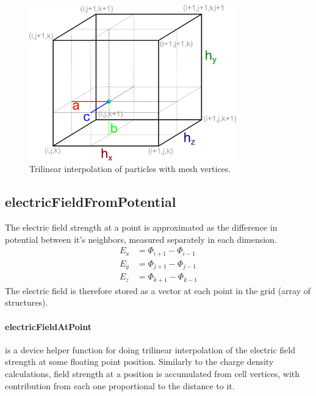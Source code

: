 \begin{figure}
	\centering
	\includegraphics[width=0.8\textwidth]{figure/trilinear}
	\caption{Trilinear interpolation of particles with mesh vertices.}
	\label{fig:trilinear}
\end{figure}

\subsection{electricFieldFromPotential}
The electric field strength at a point is approximated as the difference in potential between it's neighbors, measured
separately in each dimension.
\begin{align*}
	E_x &= \Phi_{i+1} - \Phi_{i-1}\\
	E_y &= \Phi_{j+1} - \Phi_{j-1}\\
	E_z &= \Phi_{k+1} - \Phi_{k-1}
\end{align*}
The electric field is therefore stored as a vector at each point in the grid (array of structures).

\paragraph{electricFieldAtPoint} is a device helper function for doing trilinear interpolation of the electric field strength at some floating point
position. Similarly to the charge density calculations, field strength at a position is accumulated from cell vertices,
with contribution from each one proportional to the distance to it.

